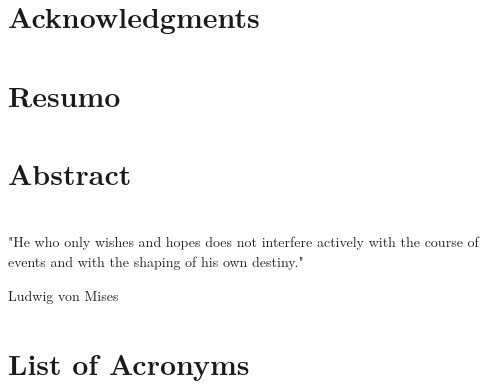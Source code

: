 \documentclass[a4paper, 11pt]{book}
\begin{document}
\frontmatter

\newpage\thispagestyle{empty}

\pagestyle{plain}



\chapter*{Acknowledgments}


\chapter*{Resumo}


\chapter*{Abstract}


\chapter*{}
\setlength\epigraphwidth{12cm}
\setlength\epigraphrule{0pt}
\makeatletter
{}
\makeatother
\vspace*{\fill}
\epigraph{"He who only wishes and hopes does not interfere actively with the course of events and with the shaping of his own destiny."}
{Ludwig von Mises}
\vspace*{\fill}

\pagestyle{plain}
\tableofcontents

\chapter*{List of Acronyms}


\listoffigures

\listoftables
\end{document}
